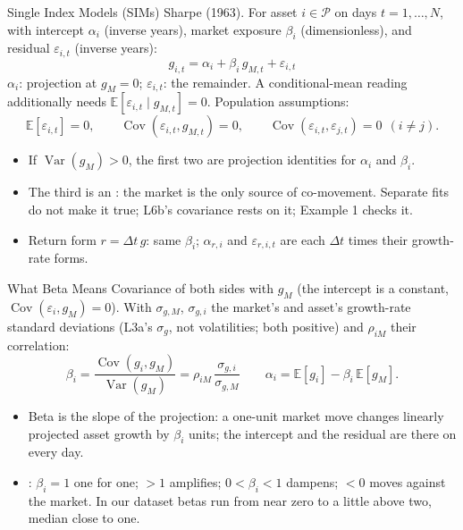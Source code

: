 \documentclass[aspectratio=169,11pt]{beamer}
\newcommand{\E}{\mathbb{E}}
\newcommand{\Var}{\operatorname{Var}}
\newcommand{\Cov}{\operatorname{Cov}}
\begin{document}
\begin{frame}{Single Index Models (SIMs)}
  Sharpe (1963). For asset $i\in\mathcal P$ on days $t=1,\ldots,N$, with
  intercept $\alpha_i$ (inverse years), market exposure $\beta_i$
  (dimensionless), and residual $\varepsilon_{i,t}$ (inverse years):
  \[
    \boxed{g_{i,t}=\alpha_i+\beta_i\,g_{M,t}+\varepsilon_{i,t}}
  \]
  $\alpha_i$: projection at $g_M=0$; $\varepsilon_{i,t}$: the
   remainder. A conditional-mean reading additionally
  needs $\E[\varepsilon_{i,t}\mid g_{M,t}]=0$. Population assumptions:
  \[
    \E[\varepsilon_{i,t}]=0,\qquad
    \Cov(\varepsilon_{i,t},g_{M,t})=0,\qquad
    \Cov(\varepsilon_{i,t},\varepsilon_{j,t})=0\ \ (i\ne j).
  \]

  \vspace{0.2em}
  \begin{itemize}\setlength{\itemsep}{0.4em}
    \item If $\Var(g_M)>0$, the first two are projection identities for
      $\alpha_i$ and $\beta_i$.
    \item The third is an : the market is the only
      source of co-movement. Separate fits do not make it true; L6b's covariance
      rests on it; Example 1 checks it.
    \item Return form $r=\Delta t\,g$: same $\beta_i$; $\alpha_{r,i}$ and
      $\varepsilon_{r,i,t}$ are each $\Delta t$ times their growth-rate forms.
  \end{itemize}
\end{frame}

\begin{frame}{What Beta Means}
  Covariance of both sides with $g_M$ (the intercept is a constant,
  $\Cov(\varepsilon_i,g_M)=0$). With $\sigma_{g,M}$, $\sigma_{g,i}$ the
  market's and asset's growth-rate standard deviations (L3a's $\sigma_g$, not
  volatilities; both positive) and $\rho_{iM}$ their correlation:
  \[
    \boxed{\beta_i=\frac{\Cov(g_i,g_M)}{\Var(g_M)}
      =\rho_{iM}\,\frac{\sigma_{g,i}}{\sigma_{g,M}}}
    \qquad
    \alpha_i=\E[g_i]-\beta_i\,\E[g_M].
  \]

  \vspace{0.3em}
  \begin{itemize}\setlength{\itemsep}{0.45em}
    \item Beta is the slope of the projection: a one-unit market move changes
      linearly projected asset growth by $\beta_i$ units; the intercept and the
      residual are there on every day.
    \item {}: $\beta_i=1$ one for one; $>1$ amplifies; $0<\beta_i<1$
      dampens; $<0$ moves against the market. In our dataset betas run from near
      zero to a little above two, median close to one.
  \end{itemize}
\end{frame}
\end{document}
